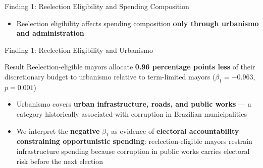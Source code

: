 \documentclass{beamer}
\begin{document}
\begin{frame}{Finding 1: Reelection Eligibility and Spending Composition}
\begin{table}
\centering
{}
\end{table}
\vspace{0.5em}
\begin{itemize}
    \item Reelection eligibility affects spending composition \textbf{only through urbanismo and administration}
\end{itemize}
\end{frame}

\begin{frame}{Finding 1: Reelection Eligibility and Urbanismo}
\begin{block}{Result}
Reelection-eligible mayors allocate \textbf{0.96 percentage points less} of their discretionary budget to urbanismo relative to term-limited mayors ($\beta_1 = -0.963$, $p = 0.001$)
\end{block}
\vspace{1em}
\begin{itemize}
    \item Urbanismo covers \textbf{urban infrastructure, roads, and public works} --- a category historically associated with corruption in Brazilian municipalities
    \vspace{1em}
    \item We interpret the \textbf{negative} $\beta_1$ as evidence of \textbf{electoral accountability constraining opportunistic spending}: reelection-eligible mayors restrain infrastructure spending because corruption in public works carries electoral risk before the next election
\end{itemize}
\end{frame}
\end{document}

